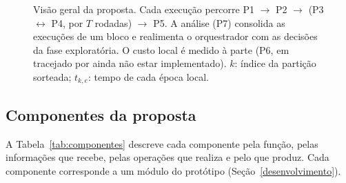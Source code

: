 \begin{figure}[t]
    \caption{Visão geral da proposta. Cada execução percorre P1 $\rightarrow$ P2 $\rightarrow$ (P3 $\leftrightarrow$ P4, por $T$ rodadas) $\rightarrow$ P5. A análise (P7) consolida as execuções de um bloco e realimenta o orquestrador com as decisões da fase exploratória. O custo local é medido à parte (P6, em tracejado por ainda não estar implementado). $k$: índice da partição sorteada; $t_{k,e}$: tempo de cada época local.}
    \label{fig:proposta}
\end{figure}

\subsection{Componentes da proposta}
\label{sec:componentes}

A Tabela~\ref{tab:componentes} descreve cada componente pela função, pelas informações que recebe, pelas operações que realiza e pelo que produz. Cada componente corresponde a um módulo do protótipo (Seção~\ref{desenvolvimento}).

